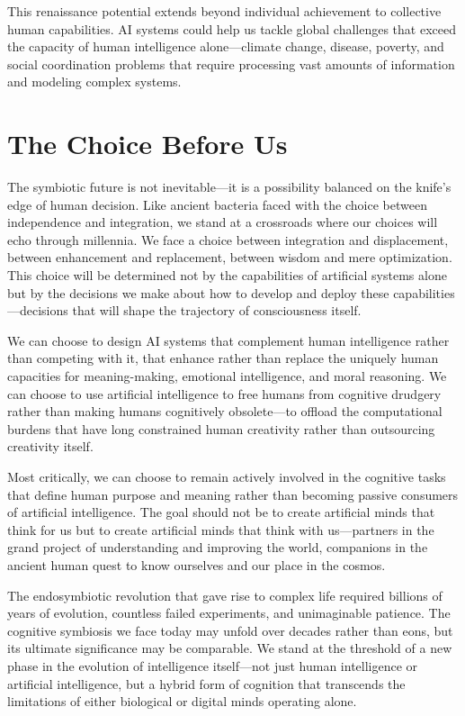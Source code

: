 This renaissance potential extends beyond individual achievement to collective human capabilities. AI systems could help us tackle global challenges that exceed the capacity of human intelligence alone—climate change, disease, poverty, and social coordination problems that require processing vast amounts of information and modeling complex systems.

\section{The Choice Before Us}

The symbiotic future is not inevitable—it is a possibility balanced on the knife's edge of human decision. Like ancient bacteria faced with the choice between independence and integration, we stand at a crossroads where our choices will echo through millennia. We face a choice between integration and displacement, between enhancement and replacement, between wisdom and mere optimization. This choice will be determined not by the capabilities of artificial systems alone but by the decisions we make about how to develop and deploy these capabilities—decisions that will shape the trajectory of consciousness itself.

We can choose to design AI systems that complement human intelligence rather than competing with it, that enhance rather than replace the uniquely human capacities for meaning-making, emotional intelligence, and moral reasoning. We can choose to use artificial intelligence to free humans from cognitive drudgery rather than making humans cognitively obsolete—to offload the computational burdens that have long constrained human creativity rather than outsourcing creativity itself.

Most critically, we can choose to remain actively involved in the cognitive tasks that define human purpose and meaning rather than becoming passive consumers of artificial intelligence. The goal should not be to create artificial minds that think for us but to create artificial minds that think with us—partners in the grand project of understanding and improving the world, companions in the ancient human quest to know ourselves and our place in the cosmos.

The endosymbiotic revolution that gave rise to complex life required billions of years of evolution, countless failed experiments, and unimaginable patience. The cognitive symbiosis we face today may unfold over decades rather than eons, but its ultimate significance may be comparable. We stand at the threshold of a new phase in the evolution of intelligence itself—not just human intelligence or artificial intelligence, but a hybrid form of cognition that transcends the limitations of either biological or digital minds operating alone.

